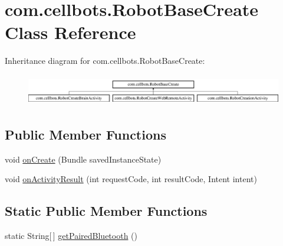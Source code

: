 \hypertarget{classcom_1_1cellbots_1_1_robot_base_create}{\section{com.\-cellbots.\-Robot\-Base\-Create Class Reference}
\label{classcom_1_1cellbots_1_1_robot_base_create}
}
Inheritance diagram for com.\-cellbots.\-Robot\-Base\-Create\-:\begin{figure}[H]
\begin{center}
\leavevmode
\includegraphics[height=1.372549cm]{classcom_1_1cellbots_1_1_robot_base_create}
\end{center}
\end{figure}
\subsection*{Public Member Functions}
\begin{DoxyCompactItemize}
\item 
void \hyperlink{classcom_1_1cellbots_1_1_robot_base_create_a4ffb9ed3243df618b692200f44745592}{on\-Create} (Bundle saved\-Instance\-State)
\item 
void \hyperlink{classcom_1_1cellbots_1_1_robot_base_create_ab5594673881e6b8f6521e3047702c636}{on\-Activity\-Result} (int request\-Code, int result\-Code, Intent intent)
\end{DoxyCompactItemize}
\subsection*{Static Public Member Functions}
\begin{DoxyCompactItemize}
\item 
static String\mbox{[}$\,$\mbox{]} \hyperlink{classcom_1_1cellbots_1_1_robot_base_create_a74e650e121afbbf506417dea8c6955b4}{get\-Paired\-Bluetooth} ()
\end{DoxyCompactItemize}
